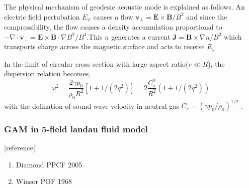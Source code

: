 \documentclass[11pt,a4paper]{article}
\begin{document}
	The physical mechanism of geodesic acoustic mode is explained as follows. An electric field pertubation $E_\psi$ causes a flow $\pmb{v_\perp}=\pmb{E}\times\pmb{B}/B^2$ and since the compressibility, the flow causes a density accumulation proportional to $-\nabla\cdot\pmb{v_\perp}=\pmb{E}\times\pmb{B}\cdot\nabla{B^2}/B^4$.This $n$ generates a current $\pmb{J}=\pmb{B}\times\nabla{n}/B^2$ which transports charge across the magnetic surface and acts to recerse $E_\psi$
	
	In the limit of circular cross section with large aspect ratio($r\ll R$), the dispersion relation becomes,
	\begin{equation}
		\omega^2=\frac{2\gamma{p_0}}{\rho_0{R}^2}[1+1/(2q^2)]=2\frac{C_s^2}{R^2}(1+1/(2q^2))
	\end{equation}
	with the defination of sound wave velocity in neutral gas $C_s=(\gamma{p_0}/\rho_0)^{1/2}$ .
	
	
	\subsubsection{GAM in 5-field landau fluid model}
	
	
	
	
	[reference]
	\begin{enumerate}
		\item Diamond PPCF 2005
		\item Winsor POF 1968
	\end{enumerate}
	
	
	
\end{document}
